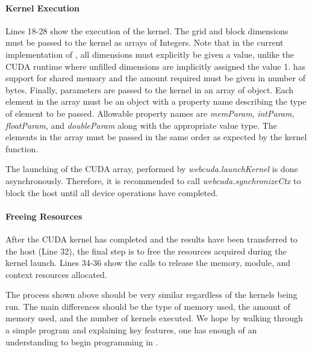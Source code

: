 \paragraph{Kernel Execution}
Lines 18-28 show the execution of the kernel. The grid and block dimensions must
be passed to the kernel as arrays of Integers. Note that in the current
implementation of \namens, all dimensions must explicitly be given a value,
unlike the CUDA runtime where unfilled dimensions are implicitly assigned the
value 1. \name has support for shared memory and the amount required must be
given in number of bytes. Finally, parameters are passed to the kernel in an
array of object. Each element in the array must be an object with a property
name describing the type of element to be passed. Allowable property names are
\textit{memParam}, \textit{intParam}, \textit{floatParam}, and
\textit{doubleParam} along with the appropriate value type. The elements in the
array must be passed in the same order as expected by the kernel function.

The launching of the CUDA array, performed by \textit{webcuda.launchKernel} is
done asynchronously. Therefore, it is recommended to call
\textit{webcuda.synchronizeCtx} to block the host until all device operations
have completed.

\paragraph{Freeing Resources}
After the CUDA kernel has completed and the results have been transferred to the
host (Line 32), the final step is to free the resources acquired during the
kernel launch. Lines 34-36 show the \name calls to release the memory, module,
and context resources allocated.

The process shown above should be very similar regardless of the kernels being
run. The main differences should be the type of memory used, the amount of
memory used, and the number of kernels executed. We hope by walking through a
simple program and explaining key \name features, one has enough of an
understanding to begin programming in \namens.

